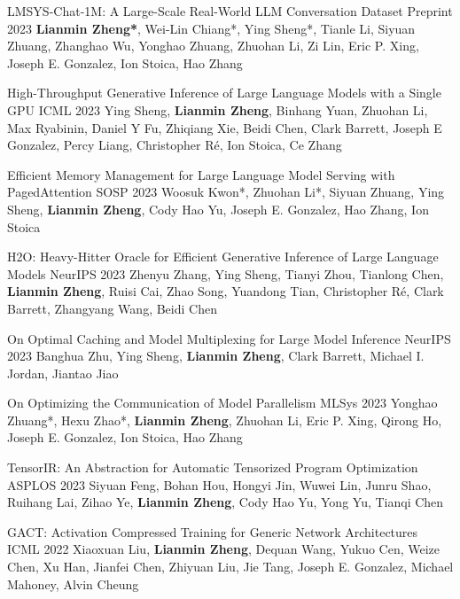 \begin{cventries}
\cventry
{}
{LMSYS-Chat-1M: A Large-Scale Real-World LLM Conversation Dataset} %
{Preprint 2023} %
{} %
{\textbf{Lianmin Zheng*}, Wei-Lin Chiang*, Ying Sheng*, Tianle Li, Siyuan Zhuang, Zhanghao Wu, Yonghao Zhuang, Zhuohan Li, Zi Lin, Eric P. Xing, Joseph E. Gonzalez, Ion Stoica, Hao Zhang}

\cventry
{}
{High-Throughput Generative Inference of Large Language Models with a Single GPU} %
{ICML 2023} %
{} %
{Ying Sheng, \textbf{Lianmin Zheng}, Binhang Yuan, Zhuohan Li, Max Ryabinin, Daniel Y Fu, Zhiqiang Xie, Beidi Chen, Clark Barrett, Joseph E Gonzalez, Percy Liang, Christopher Ré, Ion Stoica, Ce Zhang}

\cventry
{}
{Efficient Memory Management for Large Language Model Serving with PagedAttention} %
{SOSP 2023} %
{} %
{Woosuk Kwon*, Zhuohan Li*, Siyuan Zhuang, Ying Sheng, \textbf{Lianmin Zheng}, Cody Hao Yu, Joseph E. Gonzalez, Hao Zhang, Ion Stoica}

\cventry
{}
{H2O: Heavy-Hitter Oracle for Efficient Generative Inference of Large Language Models} %
{NeurIPS 2023} %
{} %
{Zhenyu Zhang, Ying Sheng, Tianyi Zhou, Tianlong Chen, \textbf{Lianmin Zheng}, Ruisi Cai, Zhao Song, Yuandong Tian, Christopher Ré, Clark Barrett, Zhangyang Wang, Beidi Chen}

\cventry
{}
{On Optimal Caching and Model Multiplexing for Large Model Inference} %
{NeurIPS 2023} %
{} %
{Banghua Zhu, Ying Sheng, \textbf{Lianmin Zheng}, Clark Barrett, Michael I. Jordan, Jiantao Jiao}

\cventry
{}
{On Optimizing the Communication of Model Parallelism} %
{MLSys 2023} %
{} %
{Yonghao Zhuang*, Hexu Zhao*, \textbf{Lianmin Zheng}, Zhuohan Li, Eric P. Xing, Qirong Ho, Joseph E. Gonzalez, Ion Stoica, Hao Zhang}

\cventry
{}
{TensorIR: An Abstraction for Automatic Tensorized Program Optimization} %
{ASPLOS 2023} %
{} %
{Siyuan Feng, Bohan Hou, Hongyi Jin, Wuwei Lin, Junru Shao, Ruihang Lai, Zihao Ye, \textbf{Lianmin Zheng}, Cody Hao Yu, Yong Yu, Tianqi Chen}

\cventry
{}
{GACT: Activation Compressed Training for Generic Network Architectures} %
{ICML 2022} %
{} %
{Xiaoxuan Liu, \textbf{Lianmin Zheng}, Dequan Wang, Yukuo Cen, Weize Chen, Xu Han, Jianfei Chen, Zhiyuan Liu, Jie Tang, Joseph E. Gonzalez, Michael Mahoney, Alvin Cheung}


\end{cventries}

